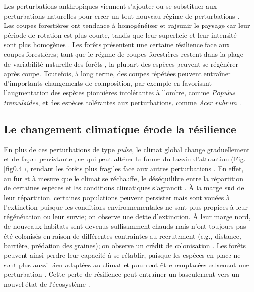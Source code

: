 Les perturbations anthropiques viennent s'ajouter ou se substituer aux
perturbations naturelles pour créer un tout nouveau régime de
perturbations \citep{boucher_land_2014}. Les coupes forestières ont
tendance à homogénéiser et rajeunir le paysage car leur période de
rotation est plus courte, tandis que leur superficie et leur intensité
sont plus homogènes
\citep{mcrae_comparisons_2001, boucher_logging-induced_2006}. Les forêts
présentent une certaine résilience face aux coupes forestières; tant que
le régime de coupes forestières restent dans la plage de variabilité
naturelle des forêts \citep{grondin_have_2018}, la plupart des espèces
peuvent se régénérer après coupe. Toutefois, à long terme, des coupes
répétées peuvent entraîner d'importants changements de composition, par
exemple en favorisant l'augmentation des espèces pionnières intolérantes
à l'ombre, comme \emph{Populus tremuloides}, et des espèces tolérantes
aux perturbations, comme \emph{Acer rubrum}
\citep{danneyrolles_stronger_2019, boucher_logging-induced_2006}.

\hypertarget{le-changement-climatique-uxe9rode-la-ruxe9silience}{%
\subsection{Le changement climatique érode la
résilience}\label{le-changement-climatique-uxe9rode-la-ruxe9silience}}

En plus de ces perturbations de type \emph{pulse}, le climat global
change graduellement et de façon persistante \citep[\emph{press
disturbance};][]{bender_perturbation_1984}, ce qui peut altérer la forme
du bassin d'attraction (Fig. \ref{fig0.4}), rendant les forêts plus
fragiles face aux autres perturbations
\citep{scheffer_catastrophic_2001}. En effet, au fur et à mesure que le
climat se réchauffe, le déséquilibre entre la répartition de certaines
espèces et les conditions climatiques s'agrandit
\citep{talluto_extinction_2017}. À la marge sud de leur répartition,
certaines populations peuvent persister mais sont vouées à l'extinction
puisque les conditions environnementales ne sont plus propices à leur
régénération ou leur survie; on observe une dette d'extinction. À leur
marge nord, de nouveaux habitats sont devenus suffisamment chauds mais
n'ont toujours pas été colonisés en raison de différentes contraintes au
recrutement (e.g., distance, barrière, prédation des graines); on
observe un crédit de colonisation
\citep{jackson_balancing_2010, tilman_habitat_1994}. Les forêts peuvent
ainsi perdre leur capacité à se rétablir, puisque les espèces en place
ne sont plus aussi bien adaptées au climat et pourront être remplacées
advenant une perturbation \citep{johnstone_changing_2016}. Cette perte
de résilience peut entraîner un basculement vers un nouvel état de
l'écosystème \citep{scheffer_catastrophic_2001}.

